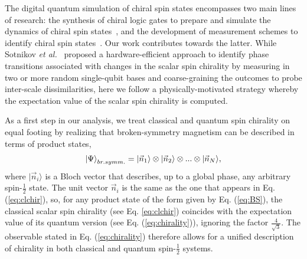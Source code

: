 \documentclass[aps,prl,twocolumn]{revtex4}
\begin{document}
The digital quantum simulation of chiral spin states encompasses two main lines of research: the synthesis of chiral logic gates to prepare and simulate the dynamics of chiral spin states~\cite{ma17,wang19}, and the development of measurement schemes to identify chiral spin states~\cite{Sotnikov22, mazurenko23}. Our work contributes towards the latter. While Sotnikov \textit{et al.}~\cite{Sotnikov22} proposed a hardware-efficient approach to identify phase transitions associated with changes in the scalar spin chirality \cite{sotnikov21} by measuring in two or more random single-qubit bases and coarse-graining the outcomes to probe inter-scale dissimilarities, here we follow a physically-motivated strategy whereby the expectation value of the scalar spin chirality is computed. %

As a first step in our analysis, we treat  classical and quantum spin chirality on equal footing by realizing that broken-symmetry magnetism can be described in terms of product states, 
\begin{eqnarray}
    \ket{\Psi}_{br.symm.}= |\vec{n}_1\rangle\otimes|\vec{n}_2\rangle \otimes ... \otimes |\vec{n}_N\rangle,
    \label{eq:BS}
\end{eqnarray}
where $|\vec{n}_i\rangle$ is a Bloch vector that describes, up to a global phase, any arbitrary spin-$\frac{1}{2}$ state. The unit vector $\vec{n}_i$ is the same as the one that appears in Eq. (\ref{eq:clchir}), so, for any product state of the form given by Eq. (\ref{eq:BS}), the classical scalar spin chirality (see Eq. \ref{eq:clchir}) coincides with the expectation value of its quantum version (see Eq. (\ref{eq:chirality})), ignoring the factor $\frac{4}{\sqrt{3}}$. The observable stated in Eq. (\ref{eq:chirality}) therefore allows for a unified description of chirality in both classical and quantum spin-$\frac{1}{2}$ systems. 
\end{document}
